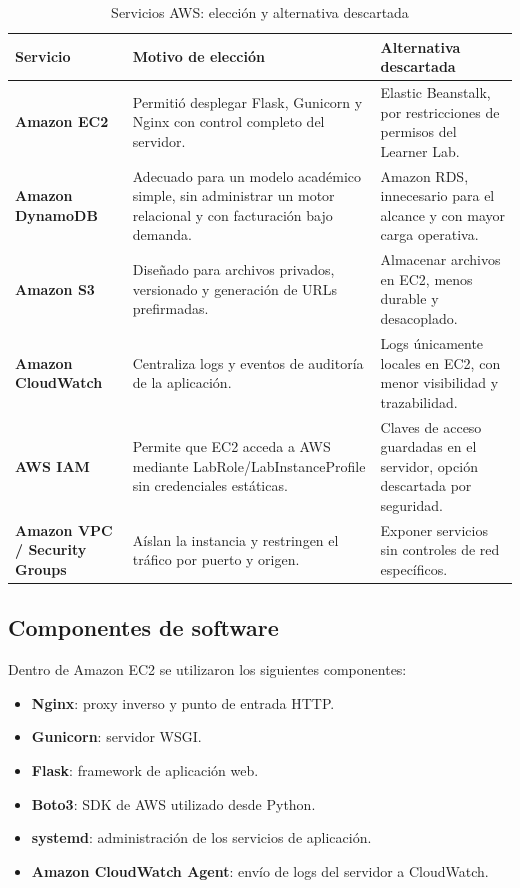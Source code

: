 \documentclass[11pt,letterpaper]{article}
\begin{document}
\begin{table}[H]
\centering
\small
\caption{Servicios AWS: elección y alternativa descartada}
\label{tab:servicios}
\begin{tabularx}{\textwidth}{>{\bfseries}p{2.2cm} X X}
\toprule
Servicio & Motivo de elección & Alternativa descartada \\
\midrule
Amazon EC2 & Permitió desplegar Flask, Gunicorn y Nginx con control completo del servidor. & Elastic Beanstalk, por restricciones de permisos del Learner Lab. \\
Amazon DynamoDB & Adecuado para un modelo académico simple, sin administrar un motor relacional y con facturación bajo demanda. & Amazon RDS, innecesario para el alcance y con mayor carga operativa. \\
Amazon S3 & Diseñado para archivos privados, versionado y generación de URLs prefirmadas. & Almacenar archivos en EC2, menos durable y desacoplado. \\
Amazon CloudWatch & Centraliza logs y eventos de auditoría de la aplicación. & Logs únicamente locales en EC2, con menor visibilidad y trazabilidad. \\
AWS IAM & Permite que EC2 acceda a AWS mediante LabRole/LabInstanceProfile sin credenciales estáticas. & Claves de acceso guardadas en el servidor, opción descartada por seguridad. \\
Amazon VPC / Security Groups & Aíslan la instancia y restringen el tráfico por puerto y origen. & Exponer servicios sin controles de red específicos. \\
\bottomrule
\end{tabularx}
\end{table}

\subsection{Componentes de software}

Dentro de Amazon EC2 se utilizaron los siguientes componentes:

\begin{itemize}[leftmargin=*,itemsep=1.5pt,topsep=2pt]
    \item \textbf{Nginx}: proxy inverso y punto de entrada HTTP.
    \item \textbf{Gunicorn}: servidor WSGI.
    \item \textbf{Flask}: framework de aplicación web.
    \item \textbf{Boto3}: SDK de AWS utilizado desde Python.
    \item \textbf{systemd}: administración de los servicios de aplicación.
    \item \textbf{Amazon CloudWatch Agent}: envío de logs del servidor a CloudWatch.
\end{itemize}
\end{document}
